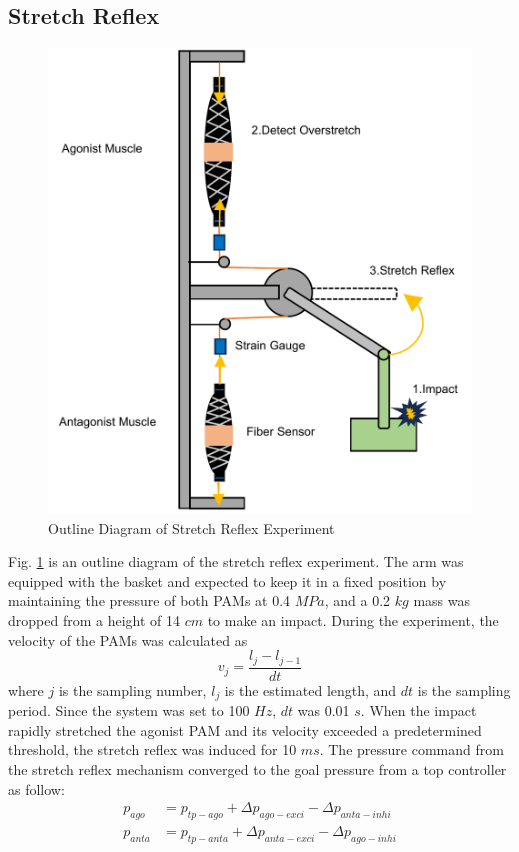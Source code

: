 \subsection{Stretch Reflex}
\begin{figure}[t]
    \centering
    \includegraphics[width=0.7\columnwidth]{fig/reflex_experiment.pdf}
    \caption{Outline Diagram of Stretch Reflex Experiment}
    \label{fig:reflex_equipment}
 \end{figure}
Fig. \ref{fig:reflex_equipment} is an outline diagram of the stretch reflex experiment.
The arm was equipped with the basket and expected to keep it in a fixed position by maintaining the pressure of both PAMs at 0.4 $\si{MPa}$, and a 0.2 $\si{kg}$ mass was dropped from a height of 14 $\si{cm}$ to make an impact. During the experiment, the velocity of the PAMs was calculated as 
\begin{equation}
    \label{eq:velocity}
    v_j = \frac{l_j -l_{j-1}}{dt}
\end{equation}
where $j$ is the sampling number, $l_j$ is the estimated length, and $dt$ is the sampling period.
Since the system was set to 100 $\si{Hz}$, $dt$ was 0.01 $\si{s}$.
When the impact rapidly stretched the agonist PAM and its velocity exceeded a predetermined threshold, the stretch reflex was induced for 10 $\si{ms}$. The pressure command from the stretch reflex mechanism converged to the goal pressure from a top controller as follow:
\begin{align}
    \label{eq:command_pressure}
    p_{ago} &= p_{tp - ago} + \Delta p_{ago - exci} - \Delta p_{anta - inhi} \\
    p_{anta} &= p_{tp - anta} + \Delta p_{anta - exci} - \Delta p_{ago - inhi}
\end{align}
